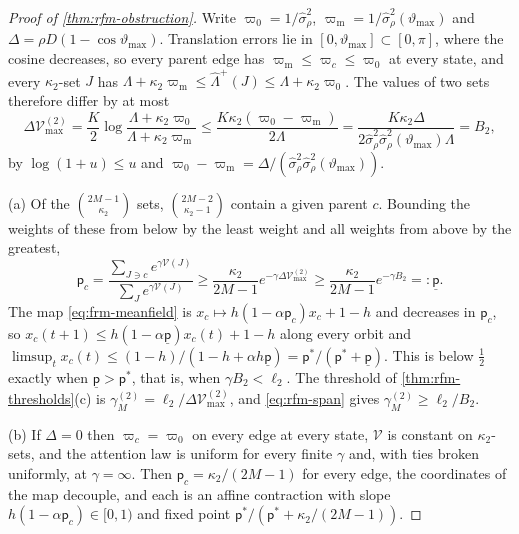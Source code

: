 \begin{proof}[Proof of \cref{thm:rfm-obstruction}]
Write $\varpi_0=1/\hat\sigma_\rho^2$, $\varpi_{\mathrm m}=1/\hat\sigma^2_\rho(\vartheta_{\max})$ and $\Delta=\rho D(1-\cos\vartheta_{\max})$. Translation errors lie in $[0,\vartheta_{\max}]\subset[0,\pi]$, where the cosine decreases, so every parent edge has $\varpi_{\mathrm m}\le\varpi_c\le\varpi_0$ at every state, and every $\kappa_2$-set $J$ has $\Lambda+\kappa_2\varpi_{\mathrm m}\le\hat\Lambda^+(J)\le\Lambda+\kappa_2\varpi_0$. The values of two sets therefore differ by at most
\begin{equation}\label{eq:rfm-span}
\Delta\mathcal V^{(2)}_{\max}=\frac K2\log\frac{\Lambda+\kappa_2\varpi_0}{\Lambda+\kappa_2\varpi_{\mathrm m}}\le\frac{K\kappa_2(\varpi_0-\varpi_{\mathrm m})}{2\Lambda}=\frac{K\kappa_2\Delta}{2\hat\sigma_\rho^2\hat\sigma^2_\rho(\vartheta_{\max})\Lambda}=B_2,
\end{equation}
by $\log(1+u)\le u$ and $\varpi_0-\varpi_{\mathrm m}=\Delta/(\hat\sigma^2_\rho\hat\sigma_\rho^2(\vartheta_{\max}))$.

(a) Of the $\binom{2M-1}{\kappa_2}$ sets, $\binom{2M-2}{\kappa_2-1}$ contain a given parent $c$. Bounding the weights of these from below by the least weight and all weights from above by the greatest,
\begin{equation*}
\mathsf p_c=\frac{\sum_{J\ni c}e^{\gamma\mathcal V(J)}}{\sum_Je^{\gamma\mathcal V(J)}}\ge\frac{\kappa_2}{2M-1}e^{-\gamma\Delta\mathcal V^{(2)}_{\max}}\ge\frac{\kappa_2}{2M-1}e^{-\gamma B_2}=:\underline{\mathsf p}.
\end{equation*}
The map \eqref{eq:frm-meanfield} is $x_c\mapsto h(1-\alpha\mathsf p_c)x_c+1-h$ and decreases in $\mathsf p_c$, so $x_c(t+1)\le h(1-\alpha\underline{\mathsf p})x_c(t)+1-h$ along every orbit and $\limsup_tx_c(t)\le(1-h)/(1-h+\alpha h\underline{\mathsf p})=\mathsf p^\ast/(\mathsf p^\ast+\underline{\mathsf p})$. This is below $\frac12$ exactly when $\underline{\mathsf p}>\mathsf p^\ast$, that is, when $\gamma B_2<\ell_2$. The threshold of \cref{thm:rfm-thresholds}(c) is $\gamma_M^{(2)}=\ell_2/\Delta\mathcal V^{(2)}_{\max}$, and \eqref{eq:rfm-span} gives $\gamma_M^{(2)}\ge\ell_2/B_2$.

(b) If $\Delta=0$ then $\varpi_c=\varpi_0$ on every edge at every state, $\mathcal V$ is constant on $\kappa_2$-sets, and the attention law is uniform for every finite $\gamma$ and, with ties broken uniformly, at $\gamma=\infty$. Then $\mathsf p_c=\kappa_2/(2M-1)$ for every edge, the coordinates of the map decouple, and each is an affine contraction with slope $h(1-\alpha\mathsf p_c)\in[0,1)$ and fixed point $\mathsf p^\ast/(\mathsf p^\ast+\kappa_2/(2M-1))$.


\end{proof}
